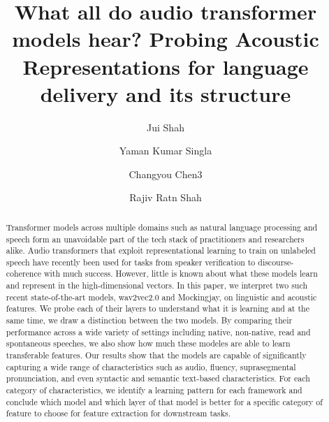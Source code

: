 \documentclass[sigconf]{acmart}
\begin{document}
\title{What all do audio transformer models hear? Probing Acoustic Representations for language delivery and its structure}


\author{Jui Shah}
\authornotemark[1]


\author{Yaman Kumar Singla}
\authornotemark[1]
\author{Changyou Chen3}

\author{Rajiv Ratn Shah}





\begin{abstract}
  Transformer models across multiple domains such as natural language processing and speech form an unavoidable part of the tech stack of practitioners and researchers alike. Audio transformers that exploit representational learning to train on unlabeled speech have recently been used for tasks from speaker verification to discourse-coherence with much success. However, little is known about what these models learn and represent in the high-dimensional vectors. In this paper, we interpret two such recent state-of-the-art models, wav2vec2.0 and Mockingjay, on linguistic and acoustic features. We probe each of their layers to understand what it is learning and at the same time, we draw a distinction between the two models. By comparing their performance across a wide variety of settings including native, non-native, read and spontaneous speeches, we also show how much these modeles are able to learn transferable features. Our results show that the models are capable of significantly capturing a wide range of characteristics such as audio, fluency, suprasegmental pronunciation, and even syntactic and semantic text-based characteristics. For each category of characteristics, we identify a learning pattern for each framework and conclude which model and which layer of that model is better for a specific category of feature to choose for feature extraction for downstream tasks.
\end{abstract}
\end{document}
